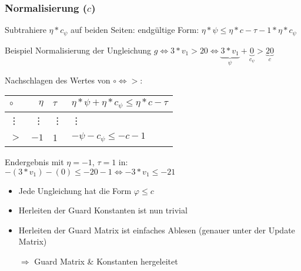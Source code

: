 \begin{frame} %
	\frametitle{Normalisierung ($c$)}
	Subtrahiere $\eta*c_\psi$ auf beiden Seiten: \newline
	endg\"ultige Form:  $\eta*\psi \le \eta*c -\tau -1*\eta*c_{\psi}$
	
	\begin{exampleblock}{Beispiel}
		Normalisierung der Ungleichung $g \Leftrightarrow 3*v_1>20 \Leftrightarrow \underbrace{3*v_1}_{\psi}+\underbrace{0}_{c_\psi} > \underbrace{20}_{c}$\newline
		
		Nachschlagen des Wertes von $\circ \Leftrightarrow >$: 
		\hspace*{1.5cm}
		\begin{tabular}{|l|r|l|l|}
			\hline
			$\circ$ 	& $\eta$ 	& $\tau$ 	&  $ \eta*\psi + \eta*c_{\psi} \le \eta*c-\tau$ \\ 
			\hline \hline
			\vdots 		& \vdots 	&  \vdots 		& \vdots \\ \hline
			$>$ 		& $-1$		&  1 		& $-\psi - c_{\psi} \le -c -1 $ \\ \hline
		\end{tabular} \newline
	
		Endergebnis mit $\eta=-1$, $\tau = 1$ in: \newline
		\hspace*{1.5cm}$-(3*v_1)-(0)\le-20-1 \Leftrightarrow -3*v_1 \le -21$
	\end{exampleblock}
\end{frame}

\begin{frame} %
	\begin{itemize}
		\item Jede Ungleichung hat die Form $\varphi \le c$
		\item Herleiten der Guard Konstanten ist nun trivial
		\item Herleiten der Guard Matrix ist einfaches Ablesen
		\hspace*{1.5cm}(genauer unter der Update Matrix)
		\item[$\Rightarrow$] Guard Matrix \& Konstanten hergeleitet \checkmark
	\end{itemize}
\end{frame}

